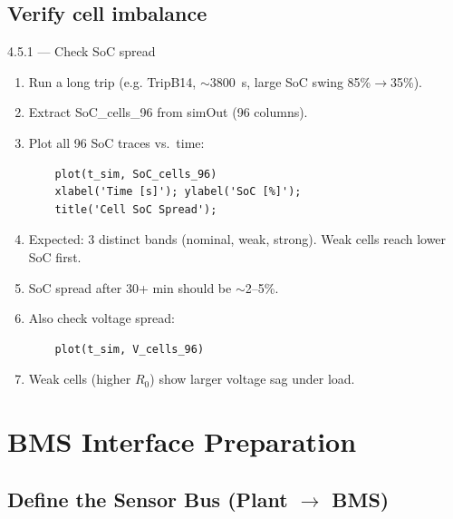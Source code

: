 \documentclass[11pt,a4paper]{article}
\begin{document}
\subsection{Verify cell imbalance}

\begin{guistep}{4.5.1 — Check SoC spread}
\begin{enumerate}
    \item Run a long trip (e.g. TripB14, $\sim$3800~s, large SoC swing 85\%$\to$35\%).
    \item Extract SoC\_cells\_96 from simOut (96 columns).
    \item Plot all 96 SoC traces vs.\ time:
    \begin{verbatim}
    plot(t_sim, SoC_cells_96)
    xlabel('Time [s]'); ylabel('SoC [%]');
    title('Cell SoC Spread');
    \end{verbatim}
    \item Expected: 3 distinct bands (nominal, weak, strong). Weak cells reach lower SoC first.
    \item SoC spread after 30+ min should be $\sim$2--5\%.
    \item Also check voltage spread:
    \begin{verbatim}
    plot(t_sim, V_cells_96)
    \end{verbatim}
    \item Weak cells (higher $R_0$) show larger voltage sag under load.
\end{enumerate}
\end{guistep}


\newpage
\section{BMS Interface Preparation}

\subsection{Define the Sensor Bus (Plant $\to$ BMS)}
\end{document}
